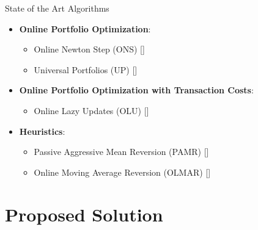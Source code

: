 \documentclass[10pt]{beamer}
\begin{document}

\begin{frame}{State of the Art Algorithms}

\begin{itemize}
  \item \textbf{Online Portfolio Optimization}:
  \begin{itemize}
    \item \alert{Online Newton Step (ONS) [\cite{agarwal2006algorithms}]}
    \item \alert{Universal Portfolios (UP) [\cite{cover1996universal}]}
  \end{itemize}
  \item \textbf{Online Portfolio Optimization with Transaction Costs}:
  \begin{itemize}
    \item \alert{Online Lazy Updates (OLU) [\cite{das2013online}]}
  \end{itemize}
  \item \textbf{Heuristics}:
  \begin{itemize}
    \item Passive Aggressive Mean Reversion (PAMR) [\cite{li2012pamr}]
    \item Online Moving Average Reversion (OLMAR) [\cite{li2015moving}]
  \end{itemize}
\end{itemize}

\end{frame}

\section{Proposed Solution}
\end{document}
